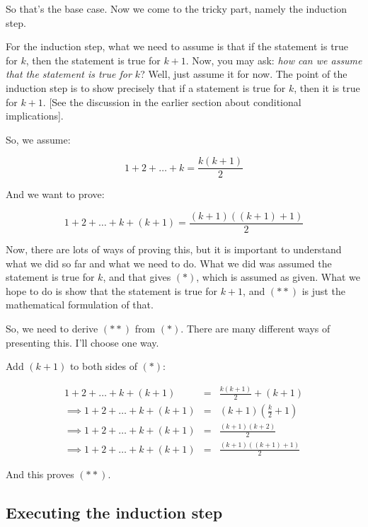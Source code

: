 \documentclass{amsart}
\begin{document}
So that's the base case. Now we come to the tricky part, namely the
induction step.

For the induction step, what we need to assume is that if the
statement is true for $k$, then the statement is true for $k +
1$. Now, you may ask: {\em how can we assume that the statement is
true for $k$}? Well, just assume it for now. The point of the
induction step is to show precisely that if a statement is true for
$k$, then it is true for $k + 1$. [See the discussion in the earlier
section about conditional implications].

So, we assume:

\begin{equation*}
  1 + 2 + \dots + k = \frac{k(k+1)}{2} \tag{*}
\end{equation*}

And we want to prove:

\begin{equation*}
  1 + 2 + \dots + k + (k + 1) = \frac{(k+1)((k+1)+1)}{2} \tag{**}
\end{equation*}

Now, there are lots of ways of proving this, but it is important to
understand what we did so far and what we need to do. What we did was
assumed the statement is true for $k$, and that gives $(*)$, which is
assumed as given. What we hope to do is show that the statement is
true for $k + 1$, and $(**)$ is just the mathematical formulation of
that.

So, we need to derive $(**)$ from $(*)$. There are many different ways
of presenting this. I'll choose one way.

Add $(k + 1)$ to both sides of $(*)$:

\begin{eqnarray*}
  1 + 2 + \dots + k + (k + 1) & = & \frac{k(k+1)}{2} + (k + 1)\\
  \implies 1 + 2 + \dots + k + (k + 1) & = & (k+1) \left(\frac{k}{2} + 1 \right)\\
  \implies 1 + 2 + \dots + k + (k + 1) & = & \frac{(k+1)(k+2)}{2}\\
  \implies 1 + 2 + \dots + k + (k + 1) & = & \frac{(k+1)((k+1)+1)}{2}
\end{eqnarray*}

And this proves $(**)$.

\subsection{Executing the induction step}
\end{document}
